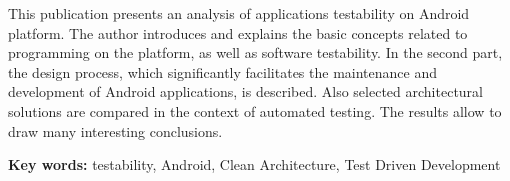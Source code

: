This publication presents an analysis of applications testability on Android platform. The author introduces and explains the basic concepts related to programming on the platform, as well as software testability. In the second part, the design process, which significantly facilitates the maintenance and development of Android applications, is described. Also selected architectural solutions are compared in the context of automated testing. The results allow to draw many interesting conclusions.

\textbf{Key words:} testability, Android, Clean Architecture, Test Driven Development


